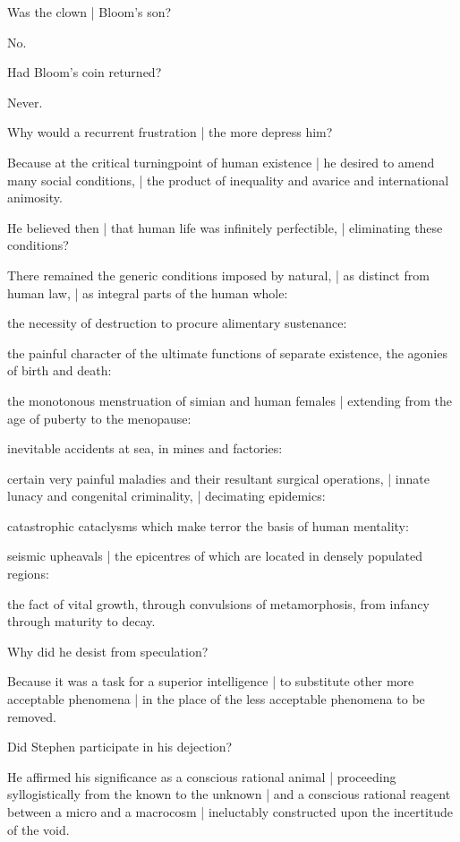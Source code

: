 Was the clown |
Bloom's son?

\Factual
No.


Had Bloom's coin returned?

\Factual
Never.


Why would a recurrent frustration |
the more depress him?

\Philosophy
Because at the critical turningpoint of human existence |
he desired to amend many social conditions, |
the product of inequality and avarice and international animosity.


He believed then |
that human life was infinitely perfectible, |
eliminating these conditions?

\Philosophy
There remained the generic conditions imposed by natural, |
as distinct from human law, |
as integral parts of the human whole:

\Memories
the necessity of destruction to procure alimentary sustenance:

\Places
the painful character of the ultimate functions of separate existence,
the agonies of birth and death:

\Household
the monotonous menstruation of simian and
human females |
extending from the age of puberty to the menopause:

\Factual
inevitable accidents at sea, in mines and factories:

\Science
certain very painful maladies and their resultant surgical operations, |
innate lunacy and congenital criminality, |
decimating epidemics:

\Poetry
catastrophic cataclysms which make terror the basis of human mentality:

\Religious
seismic upheavals |
the epicentres of which are located in densely populated regions:

\Science
the fact of vital growth,
through convulsions of metamorphosis,
from infancy through maturity to decay.


Why did he desist from speculation?

\Philosophy
Because it was a task for a superior intelligence |
to substitute other more acceptable phenomena |
in the place of the less acceptable phenomena to be removed.%


Did Stephen participate in his dejection?

\Philosophy
He affirmed his significance as a conscious rational animal |
proceeding syllogistically from the known to the unknown |
and a conscious rational reagent
between a micro and a macrocosm |
ineluctably constructed upon the incertitude of the void.


